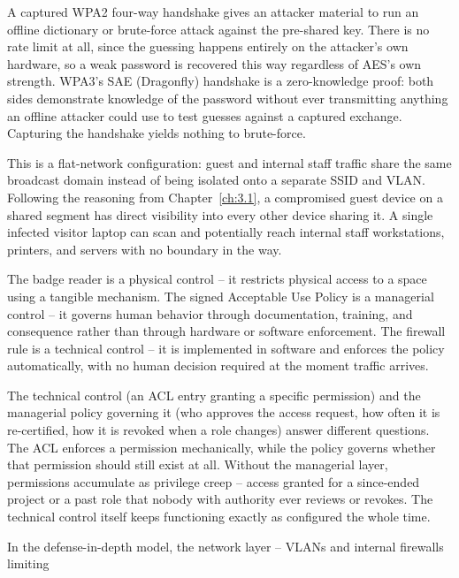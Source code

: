 \begin{answerkey}
\item A captured WPA2 four-way handshake gives an attacker material to run an offline dictionary or
brute-force attack against the pre-shared key. There is no rate limit at all, since the guessing
happens entirely on the attacker's own hardware, so a weak password is recovered this way regardless
of AES's own strength. WPA3's SAE (Dragonfly) handshake is a zero-knowledge proof: both sides
demonstrate knowledge of the password without ever transmitting anything an offline attacker could
use to test guesses against a captured exchange. Capturing the handshake yields nothing to
brute-force.
\item This is a flat-network configuration: guest and internal staff traffic share the same
broadcast domain instead of being isolated onto a separate SSID and VLAN. Following the reasoning
from Chapter~\ref{ch:3.1}, a compromised guest device on a shared segment has direct visibility into
every other device sharing it. A single infected visitor laptop can scan and potentially reach
internal staff workstations, printers, and servers with no boundary in the way.
\item The badge reader is a physical control -- it restricts physical access to a space using a
tangible mechanism. The signed Acceptable Use Policy is a managerial control -- it governs human
behavior through documentation, training, and consequence rather than through hardware or software
enforcement. The firewall rule is a technical control -- it is implemented in software and enforces
the policy automatically, with no human decision required at the moment traffic arrives.
\item The technical control (an ACL entry granting a specific permission) and the managerial policy
governing it (who approves the access request, how often it is re-certified, how it is revoked when
a role changes) answer different questions. The ACL enforces a permission mechanically, while the
policy governs whether that permission should still exist at all. Without the managerial layer,
permissions accumulate as privilege creep -- access granted for a since-ended project or a past role
that nobody with authority ever reviews or revokes. The technical control itself keeps functioning
exactly as configured the whole time.
\item In the defense-in-depth model, the network layer -- VLANs and internal firewalls limiting

\end{answerkey}
